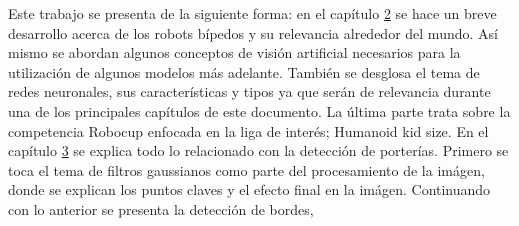 Este trabajo se presenta de la siguiente forma: en el capítulo \hyperref[sec:marcoteorico]{2} se hace un breve desarrollo acerca de los robots bípedos y su relevancia alrededor del mundo. Así mismo se abordan algunos conceptos de visión artificial necesarios para la utilización de algunos modelos más adelante. También se desglosa el tema de redes neuronales, sus características y tipos ya que serán de relevancia durante una de los principales capítulos de este documento. La última parte trata sobre la competencia Robocup enfocada en la liga de interés; Humanoid kid size. En el capítulo \hyperref[sec:porteria]{3} se explica todo lo relacionado con la detección de porterías. Primero se toca el tema de filtros gaussianos como parte del procesamiento de la imágen, donde se explican los puntos claves y el efecto final en la imágen. Continuando con lo anterior se presenta la detección de bordes,   
